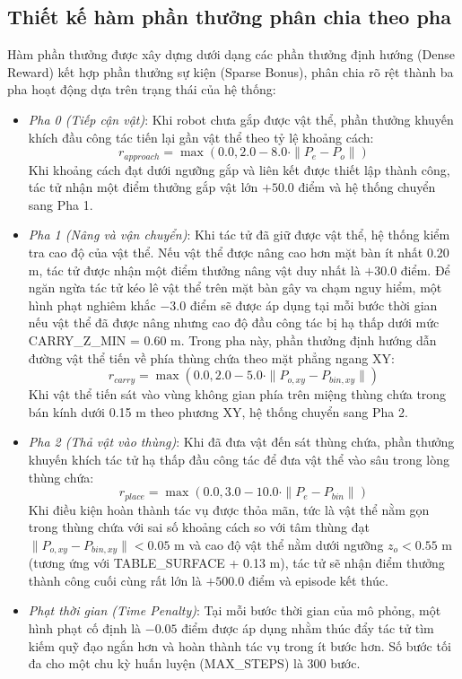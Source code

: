 \documentclass[conference]{IEEEtran}
\begin{document}
\subsection{Thiết kế hàm phần thưởng phân chia theo pha}
Hàm phần thưởng được xây dựng dưới dạng các phần thưởng định hướng (Dense Reward) kết hợp phần thưởng sự kiện (Sparse Bonus), phân chia rõ rệt thành ba pha hoạt động dựa trên trạng thái của hệ thống:
\begin{itemize}
    \item \textit{Pha 0 (Tiếp cận vật)}: Khi robot chưa gắp được vật thể, phần thưởng khuyến khích đầu công tác tiến lại gần vật thể theo tỷ lệ khoảng cách:
    \begin{equation}
    r_{approach} = \max\left(0.0, 2.0 - 8.0 \cdot \| P_e - P_o \|\right)
    \end{equation}
    Khi khoảng cách đạt dưới ngưỡng gắp và liên kết được thiết lập thành công, tác tử nhận một điểm thưởng gắp vật lớn $+50.0$ điểm và hệ thống chuyển sang Pha 1.
    \item \textit{Pha 1 (Nâng và vận chuyển)}: Khi tác tử đã giữ được vật thể, hệ thống kiểm tra cao độ của vật thể. Nếu vật thể được nâng cao hơn mặt bàn ít nhất 0.20 m, tác tử được nhận một điểm thưởng nâng vật duy nhất là $+30.0$ điểm. Để ngăn ngừa tác tử kéo lê vật thể trên mặt bàn gây va chạm nguy hiểm, một hình phạt nghiêm khắc $-3.0$ điểm sẽ được áp dụng tại mỗi bước thời gian nếu vật thể đã được nâng nhưng cao độ đầu công tác bị hạ thấp dưới mức CARRY\_Z\_MIN = 0.60 m. Trong pha này, phần thưởng định hướng dẫn đường vật thể tiến về phía thùng chứa theo mặt phẳng ngang XY:
    \begin{equation}
    r_{carry} = \max\left(0.0, 2.0 - 5.0 \cdot \| P_{o,xy} - P_{bin,xy} \|\right)
    \end{equation}
    Khi vật thể tiến sát vào vùng không gian phía trên miệng thùng chứa trong bán kính dưới 0.15 m theo phương XY, hệ thống chuyển sang Pha 2.
    \item \textit{Pha 2 (Thả vật vào thùng)}: Khi đã đưa vật đến sát thùng chứa, phần thưởng khuyến khích tác tử hạ thấp đầu công tác để đưa vật thể vào sâu trong lòng thùng chứa:
    \begin{equation}
    r_{place} = \max\left(0.0, 3.0 - 10.0 \cdot \| P_e - P_{bin} \|\right)
    \end{equation}
    Khi điều kiện hoàn thành tác vụ được thỏa mãn, tức là vật thể nằm gọn trong thùng chứa với sai số khoảng cách so với tâm thùng đạt $\|P_{o,xy} - P_{bin,xy}\| < 0.05$ m và cao độ vật thể nằm dưới ngưỡng $z_o < 0.55$ m (tương ứng với TABLE\_SURFACE + 0.13 m), tác tử sẽ nhận điểm thưởng thành công cuối cùng rất lớn là $+500.0$ điểm và episode kết thúc.
    \item \textit{Phạt thời gian (Time Penalty)}: Tại mỗi bước thời gian của mô phỏng, một hình phạt cố định là $-0.05$ điểm được áp dụng nhằm thúc đẩy tác tử tìm kiếm quỹ đạo ngắn hơn và hoàn thành tác vụ trong ít bước hơn. Số bước tối đa cho một chu kỳ huấn luyện (MAX\_STEPS) là 300 bước.
\end{itemize}
\end{document}
